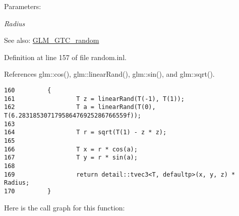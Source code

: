 \begin{Desc}
\item[Parameters:]
\begin{description}
\item[{\em Radius}]\end{description}
\end{Desc}
\begin{Desc}
\item[See also:]\hyperlink{group__gtc__random}{GLM\_\-GTC\_\-random} \end{Desc}


Definition at line 157 of file random.inl.

References glm::cos(), glm::linearRand(), glm::sin(), and glm::sqrt().

\begin{Code}\begin{verbatim}160         {
161                 T z = linearRand(T(-1), T(1));
162                 T a = linearRand(T(0), T(6.283185307179586476925286766559f));
163         
164                 T r = sqrt(T(1) - z * z);
165         
166                 T x = r * cos(a);
167                 T y = r * sin(a);
168         
169                 return detail::tvec3<T, defaultp>(x, y, z) * Radius;    
170         }
\end{verbatim}
\end{Code}




Here is the call graph for this function: